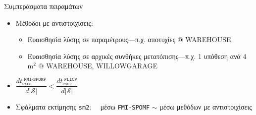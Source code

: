 \begin{frame}{Συμπεράσματα πειραμάτων}

  \begin{itemize}
    \item Μέθοδοι με αντιστοιχίσεις:
      \begin{itemize}
        \item Ευαισθησία λύσης σε παραμέτρους---π.χ. αποτυχίες @ WAREHOUSE
        \item Ευαισθησία λύσης σε αρχικές συνθήκες μετατόπισης---π.χ. 1 υπόθεση ανά 4 m$^2$ @ WAREHOUSE, WILLOWGARAGE
      \end{itemize}
    \item $\dfrac{dt_{\text{exec}}^{\texttt{\ FMI-SPOMF}}}{d|\mathcal{S}|} < \dfrac{dt_{\text{exec}}^{\texttt{\ PLICP}}}{d|\mathcal{S}|}$
    \item Σφάλματα εκτίμησης \texttt{sm2}: \ \ μέσω \texttt{FMI-SPOMF} $\sim$ μέσω μεθόδων με αντιστοιχίσεις
  \end{itemize}

\end{frame}
